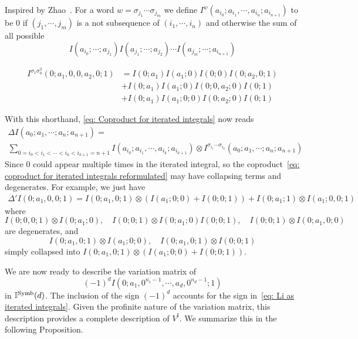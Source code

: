 \begin{definition}\label{def: I^w}
Inspired by Zhao~\cite{Zhao_MultipleZetaFunctionsMultiplePolylogarithmsAndTheirSpecialValues}. For a word $w=\sigma_{j_1}\cdots\sigma_{j_m}$ we define $I^w(a_{i_0};a_{i_1},\cdots,a_{i_n};a_{i_{n+1}})$ to be $0$ if $(j_1,\cdots,j_m)$ is a not subsequence of $(i_1,\cdots,i_n)$ and otherwise the sum of all possible
\[
I(a_{i_0};\cdots;a_{j_1})I(a_{j_1};\cdots;a_{j_2})\cdots I(a_{j_m};\cdots;a_{i_{n+1}})
\]
\end{definition}

\begin{example}\label{ex: shorthand for product of iterated integrals}
\begin{align*}
I^{\sigma_1\sigma_0^2}(0;a_1,0,0,a_2,0;1)&=I(0;a_1)I(a_1;0)I(0;0)I(0;a_2,0;1)\\
&+I(0;a_1)I(a_1;0)I(0;0,a_2;0)I(0;1)\\
&+I(0;a_1)I(a_1;0;0)I(0;a_2;0)I(0;1)
\end{align*}
\end{example}

With this shorthand, \eqref{eq: Coproduct for iterated integrals} now reads
\begin{multline}\label{eq: coproduct for iterated integrals reformulated}
\Delta I(a_0;a_1,\cdots;a_n;a_{n+1})=\\
\sum_{0=i_0<i_1<\cdots<i_k<i_{k+1}=n+1}I(a_{i_0};a_{i_1},\cdots,a_{i_k};a_{i_{k+1}})\otimes I^{\sigma_{i_1}\cdots\sigma_{i_k}}(a_0;a_1,\cdots;a_n;a_{n+1})
\end{multline}
Since $0$ could appear multiple times in the iterated integral, so the coproduct~\eqref{eq: coproduct for iterated integrals reformulated} may have collapsing terms and degenerates. For example, we just have
\begin{multline}
\Delta' I(0;a_1,0,0;1)=I(0;a_1,0;1)\otimes\left(I(a_1;0;0)+I(0;0;1)\right) + I(0;a_1;1)\otimes I(a_1;0,0;1)
\end{multline}
where
\[
I(0;0,0;1)\otimes I(0;a_1;0),\quad I(0;0;1)\otimes I(0;a_1;0)I(0;0;1),\quad I(0;0;1)\otimes I(0;a_1,0;0)
\]
are degenerates, and
\[
I(0;a_1,0;1)\otimes I(a_1;0;0),\quad I(0;a_1,0;1)\otimes I(0;0;1)
\]
simply collapsed into $I(0;a_1,0;1)\otimes\left(I(a_1;0;0)+I(0;0;1)\right)$.

We are now ready to describe the variation matrix of
\[
(-1)^dI(0;a_1,0^{n_1-1},\cdots,a_d,0^{n_d-1};1)
\]
in $\mathbb I^{\operatorname{Symb}}(d)$. The inclusion of the sign $(-1)^d$ accounts for the sign in~\eqref{eq: Li as iterated integrals}. Given the profinite nature of the variation matrix, this description provides a complete description of $V^{\mathbb I}$. We summarize this in the following Proposition.

